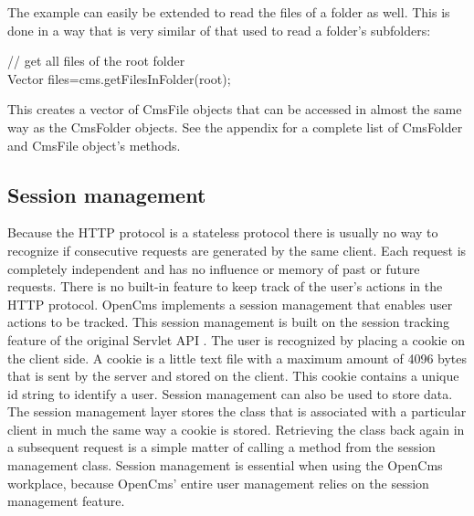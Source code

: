 The example can easily be extended to read the files of a folder as
well. This is done in a way that is very similar of that used to read a
folder's subfolders:

\begin{java}
// get all files of the root folder\\
Vector files=cms.getFilesInFolder(root);\\
\end{java}

This creates a vector of CmsFile objects that can be accessed in almost
the same way as the CmsFolder objects. See the appendix for a complete
list of CmsFolder and CmsFile object's methods.

\subsection{Session management}

Because the HTTP protocol is a stateless protocol there is usually no
way to recognize if consecutive requests are generated by the same
client. Each request is completely independent and has no influence or
memory of past or future requests. There is no built-in feature to keep
track of the user's actions in the HTTP protocol. OpenCms implements a
session management that enables user actions to be tracked. This
session management is built on the session tracking feature of the
original Servlet API . The user is recognized by placing a cookie on
the client side.  A cookie is  a little text file with a maximum amount
of 4096 bytes that is sent by the server and stored on the client. This
cookie contains a unique id string to identify a user. Session
management can also be used to store data. The session management layer
stores the class that is associated with a particular client in much
the same way a cookie is stored. Retrieving the class back again in a
subsequent request is a simple matter of calling a method from the
session management class.
Session management is essential when using the OpenCms workplace,
because OpenCms' entire user management relies on the session
management feature.

